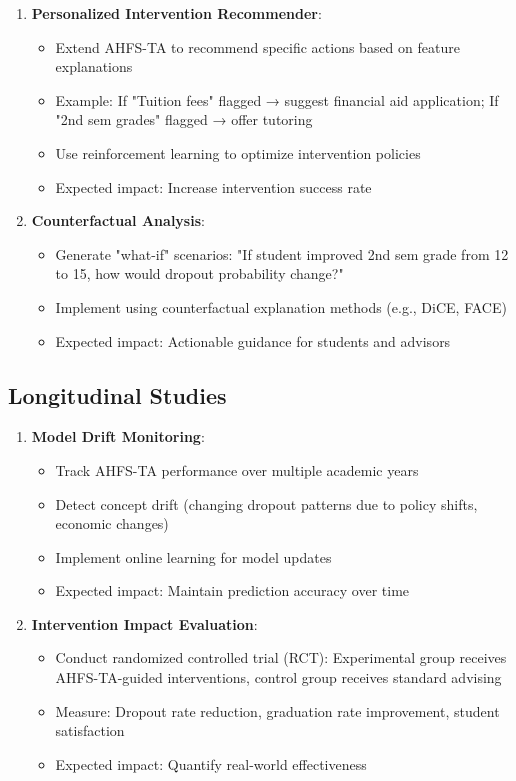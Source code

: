 \begin{enumerate}
\item \textbf{Personalized Intervention Recommender}:
\begin{itemize}
\item Extend AHFS-TA to recommend specific actions based on feature explanations
\item Example: If "Tuition fees" flagged → suggest financial aid application; If "2nd sem grades" flagged → offer tutoring
\item Use reinforcement learning to optimize intervention policies
\item Expected impact: Increase intervention success rate
\end{itemize}

\item \textbf{Counterfactual Analysis}:
\begin{itemize}
\item Generate "what-if" scenarios: "If student improved 2nd sem grade from 12 to 15, how would dropout probability change?"
\item Implement using counterfactual explanation methods (e.g., DiCE, FACE)
\item Expected impact: Actionable guidance for students and advisors
\end{itemize}
\end{enumerate}

\subsection{Longitudinal Studies}

\begin{enumerate}
\item \textbf{Model Drift Monitoring}:
\begin{itemize}
\item Track AHFS-TA performance over multiple academic years
\item Detect concept drift (changing dropout patterns due to policy shifts, economic changes)
\item Implement online learning for model updates
\item Expected impact: Maintain prediction accuracy over time
\end{itemize}

\item \textbf{Intervention Impact Evaluation}:
\begin{itemize}
\item Conduct randomized controlled trial (RCT): Experimental group receives AHFS-TA-guided interventions, control group receives standard advising
\item Measure: Dropout rate reduction, graduation rate improvement, student satisfaction
\item Expected impact: Quantify real-world effectiveness
\end{itemize}
\end{enumerate}

